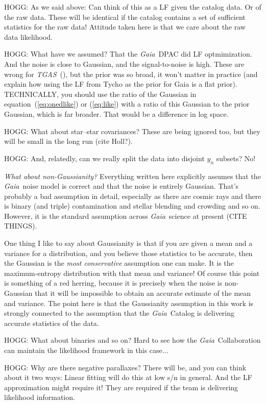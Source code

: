 \documentclass[12pt, modern]{aastex62}
\newcommand{\acronym}[1]{{\small{#1}}}
\newcommand{\Gaia}{\textsl{Gaia}}
\newcommand{\TGAS}{\textsl{\acronym{TGAS}}}
\newcommand{\equationname}{equation}
\begin{document}
HOGG: As we said above: Can think of this as a LF given the catalog data. Or of the raw data.
These will be identical if the catalog contains a set of sufficient statistics
for the raw data!
Attitude taken here is that we care about the raw data likelihood.

HOGG: What have we assumed? That the \Gaia\ DPAC did LF optmimization. And the
noise is close to Gaussian, and the signal-to-noise is high. These are wrong for
\TGAS\ (\citealt{michalik}), but the prior was so broad, it won't matter in practice (and explain how using the LF from Tycho as the prior for Gaia is a flat prior). TECHNICALLY, you should use
the ratio of the Gaussian in \equationname~(\ref{eq:onedlike}) or (\ref{eq:like}) with
a ratio of this Gaussian to the prior Gaussian, which is far broader. That would be
a difference in log space.

HOGG: What about star--star covariances? These are being ignored too, but they
will be small in the long run (cite Holl?).

HOGG: And, relatedly, can we really split the data into disjoint $y_n$ subsets?
No!

\emph{What about non-Gaussianity?} Everything written here
 explicitly assumes that the \Gaia\ noise
model is correct and that the noise is entirely Gaussian.
That's probably a bad assumption in detail,
especially as there are cosmic rays and there is binary (and triple)
contamination and stellar blending and crowding and so on.
However, it is the standard assumption across \Gaia\ science at present (CITE THINGS).

One thing I like to say about Gaussianity is that if you are given a mean
and a variance for a distribution, and you believe those statistics to be
accurate, then the Gaussian is the \emph{most conservative} assumption one
can make.
It is the maximum-entropy distribution with that mean and variance!
Of course this point is something of a red herring, because it is precisely
when the noise is non-Gaussian that it will be impossible to obtain an
accurate estimate of the mean and variance.
The point here is that the Gaussianity assumption in this work is strongly connected
to the assumption that the \Gaia\ Catalog is delivering accurate statistics of
the data.

HOGG: What about binaries and so on? Hard to see how the \Gaia\ Collaboration can
maintain the likelihood framework in this case...

HOGG: Why are there negative parallaxes? There will be, and you can think about
it two ways: Linear fitting will do this at low s/n in general. And the
LF approximation might require it!
They are required if the team is delivering likelihood information.
\end{document}
